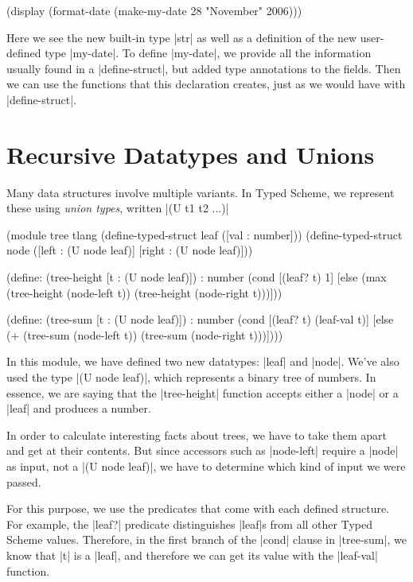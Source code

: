 \documentclass{book}
\begin{document}
\begin{schemeregion}
\begin{schemedisplay}
  (display (format-date (make-my-date 28 "November" 2006)))
\end{schemedisplay}

Here we see the new built-in type \scheme|str| as well as a definition
of the new user-defined type \scheme|my-date|.  To define
\scheme|my-date|, we provide all the information usually found in a
\scheme|define-struct|, but added type annotations to the fields.
Then we can use the functions that this declaration creates, just as
we would have with \scheme|define-struct|.

\section{Recursive Datatypes and Unions}

Many data structures involve multiple variants.  In Typed Scheme, we
represent these using {\it union types}, written \scheme|(U t1 t2 ...)|

\begin{schemedisplay}
(module tree tlang
  (define-typed-struct leaf ([val : number]))
  (define-typed-struct node ([left : (U node leaf)] [right : (U node leaf)]))
  
  (define: (tree-height [t : (U node leaf)]) : number
    (cond [(leaf? t) 1]
          [else (max (tree-height (node-left t))
                     (tree-height (node-right t)))]))

  (define: (tree-sum [t : (U node leaf)]) : number
    (cond [(leaf? t) (leaf-val t)]
          [else (+ (tree-sum (node-left t))
                   (tree-sum (node-right t)))])))
\end{schemedisplay}

In this module, we have defined two new datatypes: \scheme|leaf| and
\scheme|node|.  We've also used the type \scheme|(U node leaf)|,
which represents a binary tree of numbers.  In essence, we are saying
that the \scheme|tree-height| function accepts either a \scheme|node|
or a \scheme|leaf| and produces a number.  

In order to calculate interesting facts about trees, we have to take
them apart and get at their contents.  But since accessors such as
\scheme|node-left| require a \scheme|node| as input, not a
\scheme|(U node leaf)|, we have to determine which kind of input we
were passed.  

For this purpose, we use the predicates that come with each defined
structure.  For example, the \scheme|leaf?| predicate distinguishes
\scheme|leaf|s from all other Typed Scheme values.  Therefore, in the
first branch of the \scheme|cond| clause in \scheme|tree-sum|, we know
that \scheme|t| is a \scheme|leaf|, and therefore we can get its value
with the \scheme|leaf-val| function.


\end{schemeregion}
\end{document}
